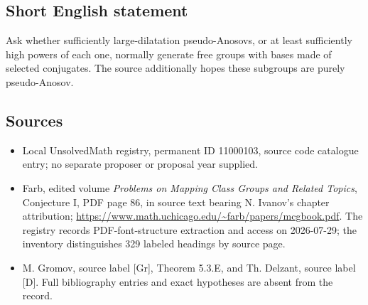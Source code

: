 \documentclass[11pt]{article}
\begin{document}
\subsection{Short English statement}
Ask whether sufficiently large-dilatation pseudo-Anosovs, or at least sufficiently high powers of each one, normally generate free groups with bases made of selected conjugates. The source additionally hopes these subgroups are purely pseudo-Anosov.
\subsection{Sources}
\begin{itemize}
\item Local UnsolvedMath registry, permanent ID 11000103, source code catalogue entry; no separate proposer or proposal year supplied.
\item Farb, edited volume \emph{Problems on Mapping Class Groups and Related Topics}, Conjecture I, PDF page 86, in source text bearing N. Ivanov's chapter attribution; \url{https://www.math.uchicago.edu/~farb/papers/mcgbook.pdf}. The registry records PDF-font-structure extraction and access on 2026-07-29; the inventory distinguishes 329 labeled headings by source page.
\item M. Gromov, source label [Gr], Theorem 5.3.E, and Th. Delzant, source label [D]. Full bibliography entries and exact hypotheses are absent from the record.
\end{itemize}
\end{document}
